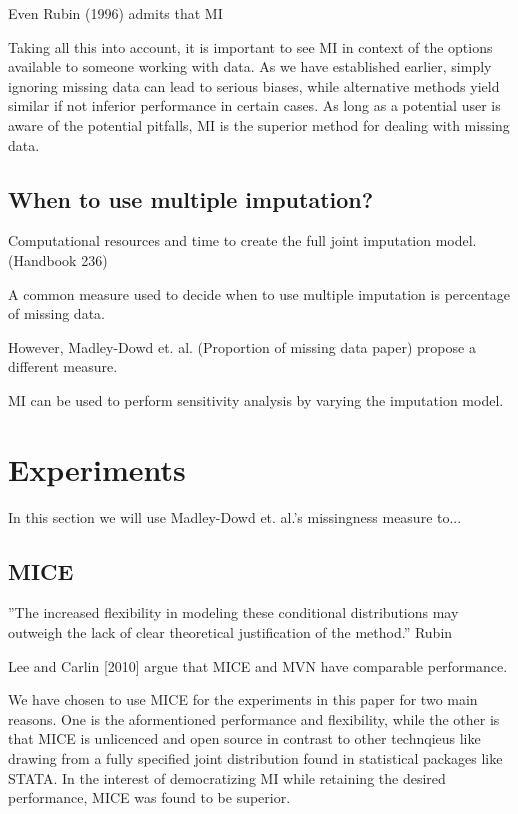 \documentclass{article}
\begin{document}
	
	Even Rubin (1996) admits that MI
	
	Taking all this into account, it is important to see MI in context of the options available to someone working with data. As we have established earlier, simply ignoring missing data can lead  to serious biases, while alternative methods yield similar if not inferior performance in certain cases. As long as a potential user is aware of the potential pitfalls, MI is the superior method for dealing with missing data.
	
	
	\subsection{When to use multiple imputation?}
	Computational resources and time to create the full joint imputation model. (Handbook 236)
	
	A common measure used to decide when to use multiple imputation is percentage of missing data.
	
	However, Madley-Dowd et. al. (Proportion of missing data paper) propose a different measure.
	
	MI can be used to perform sensitivity analysis by varying the imputation model.
	
	\section{Experiments}
	In this section we will use Madley-Dowd et. al.'s missingness measure to...
	
	\subsection{MICE}
	''The
	increased flexibility in modeling these conditional distributions may outweigh
	the lack of clear theoretical justification of the method.'' Rubin
	
	Lee and Carlin  [2010] argue that MICE and MVN have comparable performance.
	
	We have chosen to use MICE for the experiments in this paper for two main reasons. One is the aformentioned performance and flexibility, while the other is that MICE is unlicenced and open source in contrast to other technqieus like drawing from a fully specified joint distribution found in statistical packages like STATA. In the interest of democratizing MI while retaining the desired performance, MICE was found to be superior.
	
\end{document}
